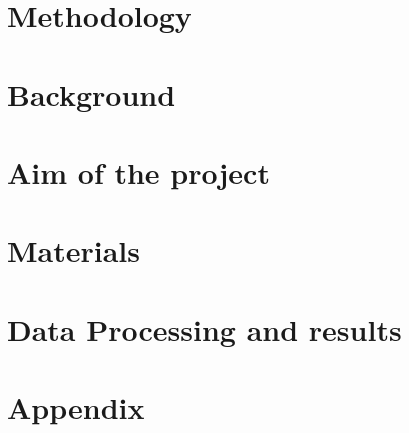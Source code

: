 

\raggedbottom %



\frontmatter	 %


\newpage
\clearpage

\newpage

\tableofcontents*												%

\mainmatter
\chapter{Methodology}


\chapter{Background} 



\chapter{Aim of the project}


\chapter{Materials}





\chapter{Data Processing and results}


\begingroup
\raggedright



%
%

\endgroup

\appendix
\chapter{Appendix}



